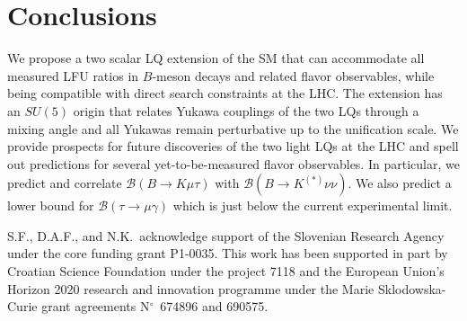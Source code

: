 \documentclass[aps,prd,superscriptaddress,twocolumn,secnumarabic]{revtex4-1}
\begin{document}
\section{Conclusions}
We propose a two scalar LQ extension of the SM that can accommodate all measured LFU ratios in $B$-meson decays and related flavor observables, while being compatible with direct search constraints at the LHC. The extension has an $SU(5)$ origin that relates Yukawa couplings of the two LQs through a mixing angle and all Yukawas remain perturbative up to the unification scale. We provide prospects for future discoveries of the two light LQs at the LHC and spell out predictions for several yet-to-be-measured flavor observables. In particular, we predict and correlate $\mathcal{B}(B\to K\mu\tau)$ with $\mathcal{B}(B\to K ^{(\ast)} \nu \nu)$. We also predict a lower bound for $\mathcal{B}(\tau\to\mu\gamma)$ which is just below the current experimental limit.

\begin{acknowledgments}
S.F., D.A.F., and N.K.\ acknowledge support of the Slovenian Research Agency under the core funding grant P1-0035. This work has been supported in part by Croatian Science Foundation under the project 7118 and the European Union's Horizon 2020 research and innovation programme under the Marie Sklodowska-Curie grant agreements N$^\circ$~674896 and 690575.
\end{acknowledgments}
\end{document}
